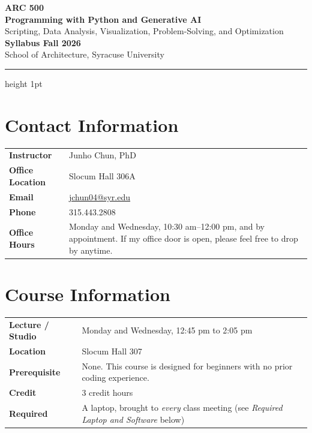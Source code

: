 \documentclass[11pt]{article}
\newcommand{\CourseCredit}{3 credit hours}
\newcommand{\OfficeHours}{Monday and Wednesday, 10:30 am--12:00 pm, and by appointment}
\begin{document}
\thispagestyle{plain}
\begin{center}
  {\LARGE\bfseries ARC 500}\\[5pt]
  {\LARGE\bfseries Programming with Python and Generative AI}\\[5pt]
  {\large Scripting, Data Analysis, Visualization, Problem-Solving, and Optimization}\\[8pt]
  {\Large\bfseries\color{suorange} Syllabus \textbar{} Fall 2026}\\[6pt]
  {\normalsize School of Architecture, Syracuse University}
\end{center}
\vspace{4pt}
{\color{rulegray}\hrule height 1pt}
\vspace{10pt}

\section{Contact Information}

\begin{tabularx}{\textwidth}{@{}l X@{}}
  \textbf{Instructor}      & Junho Chun, PhD \\
  \textbf{Office Location} & Slocum Hall 306A \\
  \textbf{Email}           & \href{mailto:jchun04@syr.edu}{jchun04@syr.edu} \\
  \textbf{Phone}           & 315.443.2808 \\
  \textbf{Office Hours}    & \OfficeHours{}. If my office door is open, please feel free to
                             drop by anytime. \\
\end{tabularx}

\section{Course Information}

\begin{tabularx}{\textwidth}{@{}l X@{}}
  \textbf{Lecture / Studio} & Monday and Wednesday, 12:45 pm to 2:05 pm \\
  \textbf{Location}         & Slocum Hall 307 \\
  \textbf{Prerequisite}     & None. This course is designed for beginners with no prior
                              coding experience. \\
  \textbf{Credit}           & \CourseCredit{} \\
  \textbf{Required}         & A laptop, brought to \emph{every} class meeting (see
                              \textit{Required Laptop and Software} below) \\
\end{tabularx}
\end{document}
